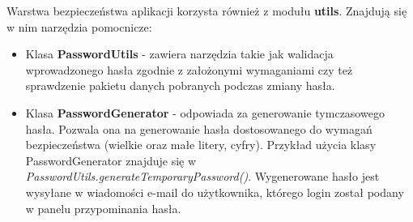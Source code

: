 \documentclass[11pt]{article}
\begin{document}
Warstwa bezpieczeństwa aplikacji korzysta również z modułu \textbf{utils}. Znajdują się w nim narzędzia pomocnicze:
\begin{itemize}
\item Klasa \textbf{PasswordUtils} - zawiera narzędzia takie jak walidacja wprowadzonego hasła zgodnie z założonymi wymaganiami czy też sprawdzenie pakietu danych pobranych podczas zmiany hasła. 
\item Klasa \textbf{PasswordGenerator} - odpowiada za generowanie tymczasowego hasła. Pozwala ona na generowanie hasła dostosowanego do wymagań bezpieczeństwa (wielkie oraz małe litery, cyfry). Przykład użycia klasy PasswordGenerator znajduje się w \emph{PasswordUtils.generateTemporaryPassword()}. Wygenerowane hasło jest wysyłane w wiadomości e-mail do użytkownika, którego login został podany w panelu przypominania hasła. 
\end{itemize}
\end{document}
